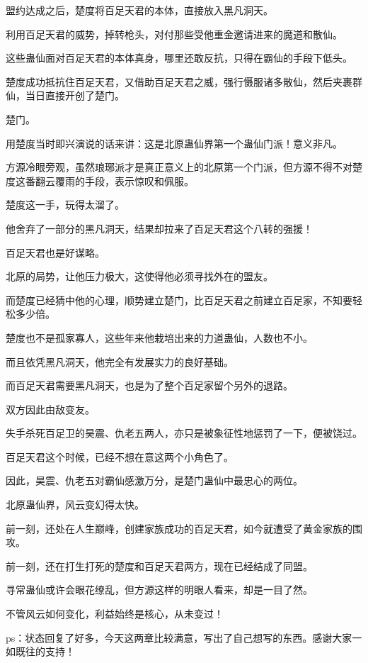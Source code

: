 \begin{this_body}
盟约达成之后，楚度将百足天君的本体，直接放入黑凡洞天。

利用百足天君的威势，掉转枪头，对付那些受他重金邀请进来的魔道和散仙。

这些蛊仙面对百足天君的本体真身，哪里还敢反抗，只得在霸仙的手段下低头。

楚度成功抵抗住百足天君，又借助百足天君之威，强行慑服诸多散仙，然后夹裹群仙，当日直接开创了楚门。

楚门。

用楚度当时即兴演说的话来讲：这是北原蛊仙界第一个蛊仙门派！意义非凡。

方源冷眼旁观，虽然琅琊派才是真正意义上的北原第一个门派，但方源不得不对楚度这番翻云覆雨的手段，表示惊叹和佩服。

楚度这一手，玩得太溜了。

他舍弃了一部分的黑凡洞天，结果却拉来了百足天君这个八转的强援！

百足天君也是好谋略。

北原的局势，让他压力极大，这使得他必须寻找外在的盟友。

而楚度已经猜中他的心理，顺势建立楚门，比百足天君之前建立百足家，不知要轻松多少倍。

楚度也不是孤家寡人，这些年来他栽培出来的力道蛊仙，人数也不小。

而且依凭黑凡洞天，他完全有发展实力的良好基础。

而百足天君需要黑凡洞天，也是为了整个百足家留个另外的退路。

双方因此由敌变友。

失手杀死百足卫的昊震、仇老五两人，亦只是被象征性地惩罚了一下，便被饶过。

百足天君这个时候，已经不想在意这两个小角色了。

因此，昊震、仇老五对霸仙感激万分，是楚门蛊仙中最忠心的两位。

北原蛊仙界，风云变幻得太快。

前一刻，还处在人生巅峰，创建家族成功的百足天君，如今就遭受了黄金家族的围攻。

前一刻，还在打生打死的楚度和百足天君两方，现在已经结成了同盟。

寻常蛊仙或许会眼花缭乱，但方源这样的明眼人看来，却是一目了然。

不管风云如何变化，利益始终是核心，从未变过！

ps：状态回复了好多，今天这两章比较满意，写出了自己想写的东西。感谢大家一如既往的支持！

\end{this_body}

